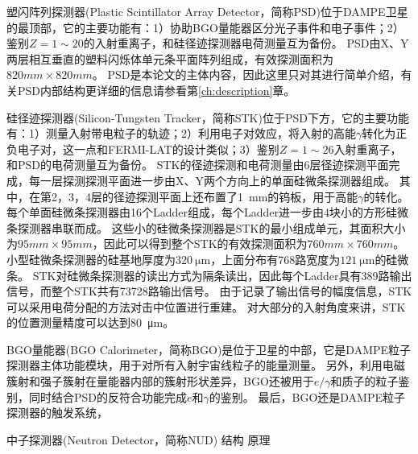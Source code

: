塑闪阵列探测器(Plastic Scintillator Array Detector，简称PSD)位于DAMPE卫星的最顶部，它的主要功能有：1）协助BGO量能器区分光子事件和电子事件；2）鉴别$Z=1\sim 20$的入射重离子，和硅径迹探测器电荷测量互为备份。
PSD由X、Y两层相互垂直的塑料闪烁体单元条平面阵列组成，有效探测面积为$820mm\times 820mm$。
PSD是本论文的主体内容，因此这里只对其进行简单介绍，有关PSD内部结构更详细的信息请参看第\ref{ch:description}章。

硅径迹探测器(Silicon-Tungsten Tracker，简称STK)位于PSD下方，它的主要功能有：1）测量入射带电粒子的轨迹；2）利用电子对效应，将入射的高能$\gamma$转化为正负电子对，这一点和FERMI-LAT的设计类似；3）鉴别$Z=1\sim 26$入射重离子，和PSD的电荷测量互为备份。
STK的径迹探测和电荷测量由6层径迹探测平面完成，每一层探测探测平面进一步由X、Y两个方向上的单面硅微条探测器组成。
其中，在第2，3，4层的径迹探测平面上还布置了\SI{1}{mm}的钨板，用于高能$\gamma$的转化。
每个单面硅微条探测器由16个Ladder组成，每个Ladder进一步由4块小的方形硅微条探测器串联而成。
这些小的硅微条探测器是STK的最小组成单元，其面积大小为$95mm\times 95mm$，因此可以得到整个STK的有效探测面积为$760mm \times 760mm$。
小型硅微条探测器的硅基地厚度为$\SI{320}{\micro\meter}$，上面分布有768路宽度为$\SI{121}{\micro\meter}$的硅微条。
STK对硅微条探测器的读出方式为隔条读出，因此每个Ladder具有389路输出信号，而整个STK共有73728路输出信号。
由于记录了输出信号的幅度信息，STK可以采用电荷分配的方法对击中位置进行重建。
对大部分的入射角度来讲，STK的位置测量精度可以达到\SI{80}{\micro\meter}。

BGO量能器(BGO Calorimeter，简称BGO)是位于卫星的中部，它是DAMPE粒子探测器主体功能模块，用于对所有入射宇宙线粒子的能量测量。
另外，利用电磁簇射和强子簇射在量能器内部的簇射形状差异，BGO还被用于$e/\gamma$和质子的粒子鉴别，同时结合PSD的反符合功能完成$e$和$\gamma$的鉴别。
最后，BGO还是DAMPE粒子探测器的触发系统，





中子探测器(Neutron Detector，简称NUD)
结构
原理


